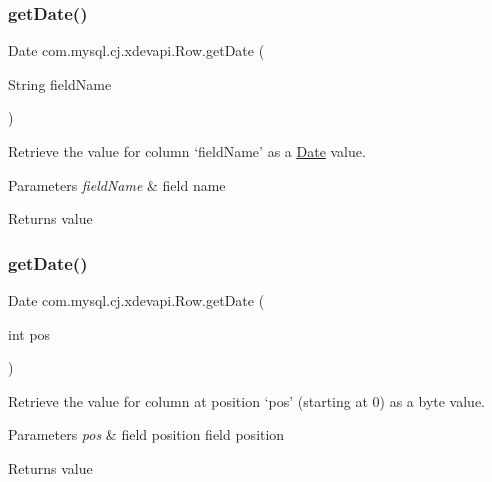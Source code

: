 \subsubsection{\texorpdfstring{get\+Date()}{getDate()}\hspace{0.1cm}{\footnotesize\ttfamily [1/2]}}
{\footnotesize\ttfamily Date com.\+mysql.\+cj.\+xdevapi.\+Row.\+get\+Date (\begin{DoxyParamCaption}\item[{String}]{field\+Name }\end{DoxyParamCaption})}

Retrieve the value for column `field\+Name' as a \mbox{\hyperlink{}{Date}} value.


\begin{DoxyParams}{Parameters}
{\em field\+Name} & field name \\
\hline
\end{DoxyParams}
\begin{DoxyReturn}{Returns}
value 
\end{DoxyReturn}
\mbox{\label{interfacecom_1_1mysql_1_1cj_1_1xdevapi_1_1_row_ae6b06eca2a1ca3b9f115d6c93fa1b3ac}} 
\subsubsection{\texorpdfstring{get\+Date()}{getDate()}\hspace{0.1cm}{\footnotesize\ttfamily [2/2]}}
{\footnotesize\ttfamily Date com.\+mysql.\+cj.\+xdevapi.\+Row.\+get\+Date (\begin{DoxyParamCaption}\item[{int}]{pos }\end{DoxyParamCaption})}

Retrieve the value for column at position `pos' (starting at 0) as a byte value.


\begin{DoxyParams}{Parameters}
{\em pos} & field position field position \\
\hline
\end{DoxyParams}
\begin{DoxyReturn}{Returns}
value 
\end{DoxyReturn}
\mbox{\label{interfacecom_1_1mysql_1_1cj_1_1xdevapi_1_1_row_ad06ed5cd59016c29578ad2a34219bbbe}} 
